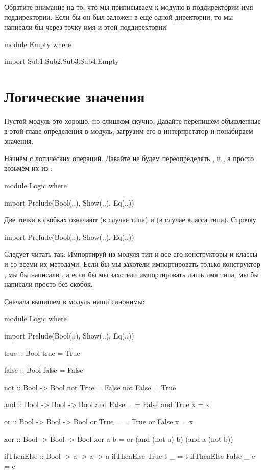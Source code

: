 Обратите внимание на то, что мы приписываем к модулю
в поддиректории  имя поддиректории. Если бы
он был заложен в ещё одной директории, то мы написали
бы через точку имя и этой поддиректории:

\begin{code}
module Empty where

import Sub1.Sub2.Sub3.Sub4.Empty
\end{code}


\section{Логические значения}

Пустой модуль это хорошо, но слишком скучно. Давайте
перепишем объявленные в этой главе определения в модуль,
загрузим его в интерпретатор и понабираем значения.

Начнём с логических операций.
Давайте не будем переопределять ,  
и , а просто возьмём их из :


\begin{code}
module Logic where

import Prelude(Bool(..), Show(..), Eq(..))
\end{code}

Две точки в скобках означают  (в случае типа)
и  (в случае класса типа). Строчку 

\begin{code}
import Prelude(Bool(..), Show(..), Eq(..))
\end{code}

Следует читать так: Импортируй из модуля 
тип  и все его конструкторы и классы 
и  со всеми их методами. Если бы мы захотели
импортировать только конструктор , мы бы написали
, а если бы мы захотели импортировать лишь
имя типа, мы бы написали просто  без скобок.

Сначала выпишем в модуль наши синонимы:

\begin{code}
module Logic where

import Prelude(Bool(..), Show(..), Eq(..))
  
true :: Bool 
true = True

false :: Bool
false = False

not :: Bool -> Bool
not True  = False
not False = True

and :: Bool -> Bool -> Bool
and False  _  = False
and True   x  = x

or  :: Bool -> Bool -> Bool
or True   _ = True
or False  x = x

xor :: Bool -> Bool -> Bool
xor a b = or (and (not a) b) (and a (not b))

ifThenElse :: Bool -> a -> a -> a
ifThenElse True   t  _ = t
ifThenElse False  _  e = e
\end{code}

